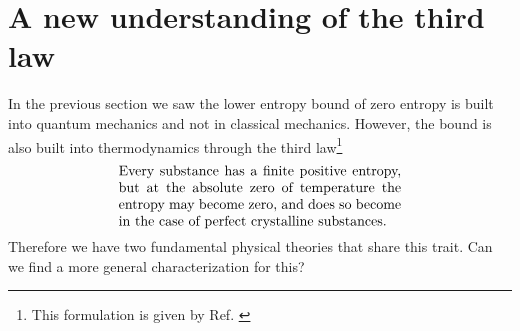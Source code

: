 \documentclass[10pt,twocolumn, nofootinbib]{revtex4-2}
\begin{document}
\section{A new understanding of the third law}


In the previous section we saw the lower entropy bound of zero entropy is built into quantum mechanics and not in classical mechanics. However, the bound is also built into thermodynamics through the third law\footnote{This formulation is given by Ref. \cite{lewis1923thermodynamics}}
\begin{align}\label{ThirdLaw}
	\parbox{2.8in}{Every substance has a finite positive entropy, but
		at the absolute zero of temperature the entropy may become zero, and does so
		become in the case of perfect crystalline substances.}
\end{align}
Therefore we have two fundamental physical theories that share this trait. Can we find a more general characterization for this?
\end{document}
